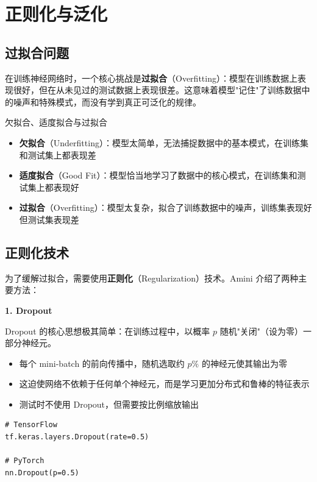 \section{正则化与泛化}

\subsection{过拟合问题}

在训练神经网络时，一个核心挑战是\textbf{过拟合}（Overfitting）：模型在训练数据上表现很好，但在从未见过的测试数据上表现很差。这意味着模型"记住"了训练数据中的噪声和特殊模式，而没有学到真正可泛化的规律。

\begin{importantbox}{欠拟合、适度拟合与过拟合}
\begin{itemize}
\item \textbf{欠拟合}（Underfitting）：模型太简单，无法捕捉数据中的基本模式，在训练集和测试集上都表现差
\item \textbf{适度拟合}（Good Fit）：模型恰当地学习了数据中的核心模式，在训练集和测试集上都表现好
\item \textbf{过拟合}（Overfitting）：模型太复杂，拟合了训练数据中的噪声，训练集表现好但测试集表现差
\end{itemize}
\end{importantbox}

\subsection{正则化技术}

为了缓解过拟合，需要使用\textbf{正则化}（Regularization）技术。Amini 介绍了两种主要方法：

\textbf{1. Dropout}

Dropout 的核心思想极其简单：在训练过程中，以概率 $p$ 随机"关闭"（设为零）一部分神经元。

\begin{itemize}
\item 每个 mini-batch 的前向传播中，随机选取约 $p\%$ 的神经元使其输出为零
\item 这迫使网络不依赖于任何单个神经元，而是学习更加分布式和鲁棒的特征表示
\item 测试时不使用 Dropout，但需要按比例缩放输出
\end{itemize}

\begin{lstlisting}[caption={Dropout 的代码实现}]
# TensorFlow
tf.keras.layers.Dropout(rate=0.5)

# PyTorch
nn.Dropout(p=0.5)
\end{lstlisting}

